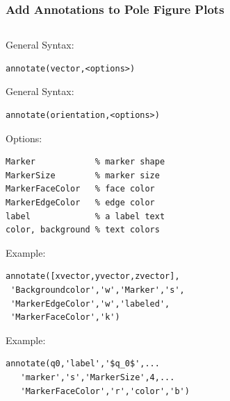 \begin{frame}[fragile]
  \frametitle{Add Annotations to Pole Figure Plots}


\begin{columns}
  \begin{column}{8.5cm}

\begin{overprint}
  General Syntax:%
\begin{lstlisting}
annotate(vector,<options>)
\end{lstlisting}
  General Syntax:
\begin{lstlisting}
annotate(orientation,<options>)
\end{lstlisting}
\end{overprint}

Options:
\begin{lstlisting}
Marker            % marker shape
MarkerSize        % marker size
MarkerFaceColor   % face color
MarkerEdgeColor   % edge color
label             % a label text
color, background % text colors
\end{lstlisting}

\begin{overprint}
  Example:
\begin{lstlisting}
annotate([xvector,yvector,zvector],
 'Backgroundcolor','w','Marker','s',
 'MarkerEdgeColor','w','labeled',
 'MarkerFaceColor','k')
\end{lstlisting}

Example:
\begin{lstlisting}
annotate(q0,'label','$q_0$',...
   'marker','s','MarkerSize',4,...
   'MarkerFaceColor','r','color','b')
\end{lstlisting}

\end{overprint}

\end{column}

  \begin{column}{3.5cm}
    \begin{overlayarea}{3.5cm}{7cm}
    \end{overlayarea}
  \end{column}

\end{columns}

\end{frame}

